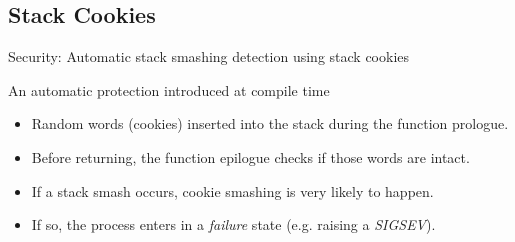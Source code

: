 \subsection{Stack Cookies}
\begin{frame}{Security: Automatic stack smashing detection using stack cookies}
	\begin{block}{An automatic protection introduced at compile time}
	\begin{itemize}
		\item Random words (cookies) inserted into the stack during the function prologue.
		\item Before returning, the function epilogue checks if those words are intact.
		\item If a stack smash occurs, cookie smashing is very likely to happen.
		\item If so, the process enters in a \emph{failure} state (e.g. raising a \emph{SIGSEV}).
	\end{itemize}
	\end{block}
\end{frame}

